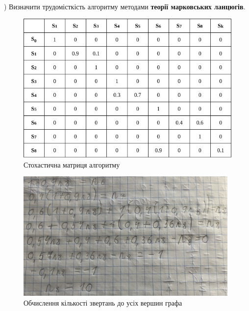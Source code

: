) Визначити трудомісткість алгоритму методами \textbf{теорії марковських ланцюгів}.
\begin{figure}[h]
    \vspace{10mm} 
    \centering
    \includegraphics[width=14cm]{reports/algos/lab1/assets/6.jpg}
    \caption{Стохастична матриця алгоритму}
\end{figure}

\begin{figure}[h] 
    \centering
    \includegraphics[width=11cm]{reports/algos/lab1/assets/8.jpg}
    \caption{Обчислення кількості звертань до усіх вершин графа}
\end{figure}

